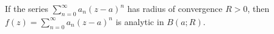 If the series $\sum_{n=0}^{\infty} a_n(z-a)^n$ has radius of convergence $R > 0$, then $f(z) = \sum_{n=0}^{\infty} a_n(z-a)^n$ is analytic in $B(a; R).$
